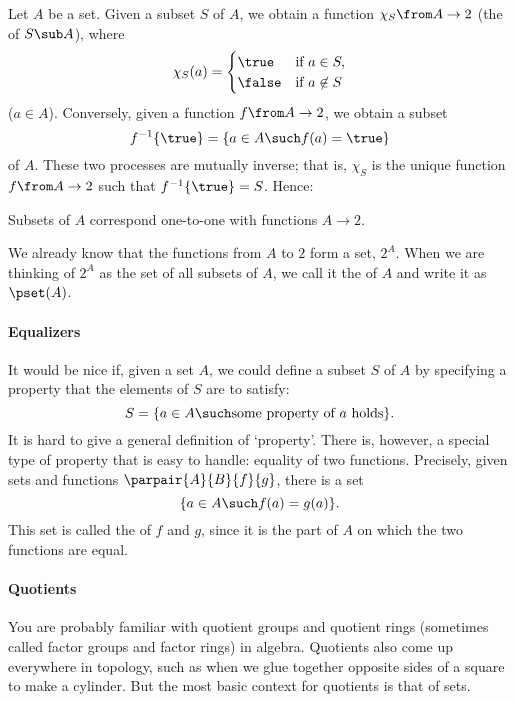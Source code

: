 Let $A$ be a set.  Given a subset%
%
%
$S$ of $A$, we obtain a function $\chi_S\from A \to 2$%
%
%
(the  of $S \sub A$), where
\[
\chi_S(a)
=
\begin{cases}
\true	&\text{if }a \in S,	\\
\false	&\text{if }a \not\in S
\end{cases}
\]
($a \in A$).  Conversely, given a function $f\from A \to 2$, we obtain a
subset
\[
f^{-1}\{\true\} 
= 
\{ a \in A \such f(a) = \true \}
\]
of $A$.  These two processes are mutually inverse; that is, $\chi_S$ is the
unique function $f\from A \to 2$ such that $f^{-1}\{\true\} = S$.  Hence:
% 
\begin{setprop}
Subsets of $A$ correspond one-to-one with functions $A \to 2$.
\end{setprop}
% 
We already know that the functions from $A$ to $2$ form a set, $2^A$.  When we
are thinking of $2^A$ as the set of all subsets of $A$, we call it the
 of $A$ and write it as $\pset(A)$.%
%
%


\paragraph*{Equalizers}  
%
%
% 
It would be nice if, given a set $A$, we could define a subset $S$ of $A$
by specifying a property that the elements of $S$ are to satisfy:
\[
S
=
\{ a \in A \such \text{some property of } a \text{ holds} \}.
\]
It is hard to give a general definition of `property'.  There is, however, a
special type of property that is easy to handle: equality of two functions.
Precisely, given sets and functions $\parpair{A}{B}{f}{g}$, there is a set
\[
\{ a \in A \such f(a) = g(a) \}.
\]
This set is called the  of $f$ and $g$, since it is the
part of $A$ on which the two functions are equal.

\paragraph*{Quotients}
You are probably familiar with quotient groups and quotient rings
(sometimes called factor groups and factor rings) in algebra.  Quotients
also come up everywhere in topology, such as when we glue together opposite
sides of a square to make a cylinder.  But the most basic context for
quotients is that of sets.

